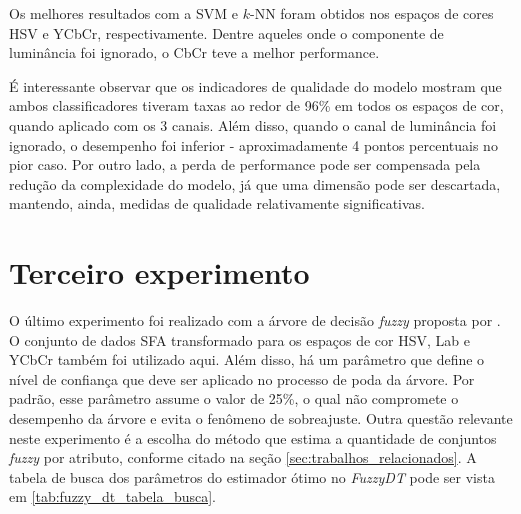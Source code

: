 Os melhores resultados com a SVM e $k$-NN foram obtidos nos espaços de cores HSV e YCbCr, respectivamente. Dentre aqueles onde o componente de luminância foi ignorado, o CbCr teve a melhor performance.

É interessante observar que os indicadores de qualidade do modelo mostram que ambos classificadores tiveram taxas ao redor de 96\% em todos os espaços de cor, quando aplicado com os 3 canais. Além disso, quando o canal de luminância foi ignorado, o desempenho foi inferior - aproximadamente 4 pontos percentuais no pior caso. Por outro lado, a perda de performance pode ser compensada pela redução da complexidade do modelo, já que uma dimensão pode ser descartada, mantendo, ainda, medidas de qualidade relativamente significativas.

\section{Terceiro experimento}
\label{sec:experimento_tres}
O último experimento foi realizado com a árvore de decisão \emph{fuzzy} proposta por \citet{cintra:13}. O conjunto de dados SFA transformado para os espaços de cor HSV, Lab e YCbCr também foi utilizado aqui. Além disso, há um parâmetro que define o nível de confiança que deve ser aplicado no processo de poda da árvore. Por padrão, esse parâmetro assume o valor de 25\%, o qual não compromete o desempenho da árvore e evita o fenômeno de sobreajuste. Outra questão relevante neste experimento é a escolha do método que estima a quantidade de conjuntos \emph{fuzzy} por atributo, conforme citado na seção \ref{sec:trabalhos_relacionados}. A tabela de busca dos parâmetros do estimador ótimo no \emph{FuzzyDT} pode ser vista em \ref{tab:fuzzy_dt_tabela_busca}.

